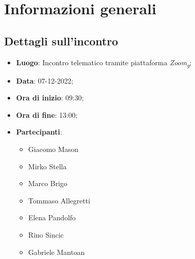 \section{Informazioni generali}

\subsection{Dettagli sull'incontro}
\begin{itemize}
\item \textbf{Luogo}: Incontro telematico tramite piattaforma \textit{Zoom\textsubscript{g}};
\item \textbf{Data}: 07-12-2022;
\item \textbf{Ora di inizio}: 09:30;
\item \textbf{Ora di fine}: 13:00;
\item \textbf{Partecipanti}: 
\begin{itemize}
	\item Giacomo Mason
	\item Mirko Stella
	\item Marco Brigo
	\item Tommaso Allegretti
	\item Elena Pandolfo
	\item Rino Sincic
	\item Gabriele Mantoan
\end{itemize}
\end{itemize}



